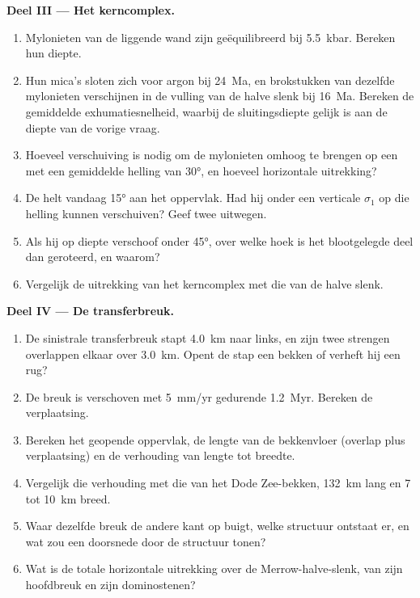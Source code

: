\begin{problem}
\medskip\noindent\textbf{Deel III --- Het kerncomplex.}
\begin{enumerate}[resume]
  \item Mylonieten van de liggende wand zijn geëquilibreerd bij \qty{5.5}{kbar}. Bereken
        hun diepte.
  \item Hun mica's sloten zich voor argon bij \qty{24}{Ma}, en brokstukken van dezelfde
        mylonieten verschijnen in de vulling van de halve slenk bij \qty{16}{Ma}. Bereken de
        gemiddelde exhumatiesnelheid, waarbij de sluitingsdiepte gelijk is aan de diepte van de
        vorige vraag.
  \item Hoeveel verschuiving is nodig om de mylonieten omhoog te brengen op een 
        met een gemiddelde helling van \ang{30}, en hoeveel horizontale uitrekking?
  \item De  helt vandaag \ang{15} aan het oppervlak. Had hij
        onder een verticale $\sigma_1$ op die helling kunnen verschuiven? Geef twee uitwegen.
  \item Als hij op diepte verschoof onder \ang{45}, over welke hoek is het
        blootgelegde deel dan geroteerd, en waarom?
  \item Vergelijk de uitrekking van het kerncomplex met die van de
        halve slenk.
\end{enumerate}

\medskip\noindent\textbf{Deel IV --- De transferbreuk.}
\begin{enumerate}[resume]
  \item De sinistrale transferbreuk stapt \qty{4.0}{km} naar links, en zijn twee
        strengen overlappen elkaar over \qty{3.0}{km}. Opent de stap een bekken
        of verheft hij een rug?
  \item De breuk is verschoven met \qty{5}{mm/yr} gedurende \qty{1.2}{Myr}. Bereken
        de verplaatsing.
  \item Bereken het geopende oppervlak, de lengte van de bekkenvloer (overlap plus
        verplaatsing) en de verhouding van lengte tot breedte.
  \item Vergelijk die verhouding met die van het Dode Zee-bekken, \qty{132}{km} lang en 7
        tot \qty{10}{km} breed.
  \item Waar dezelfde breuk de andere kant op buigt, welke structuur ontstaat er, en
        wat zou een doorsnede door de structuur tonen?
  \item Wat is de totale horizontale uitrekking over de Merrow-halve-slenk,
        van zijn hoofdbreuk en zijn dominostenen?
\end{enumerate}
\end{problem}
